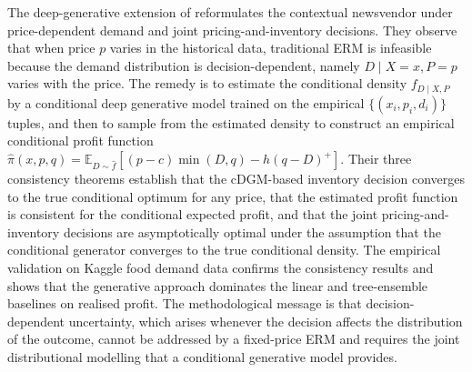 The deep-generative extension of \citet{HanZhengMisra2024} reformulates the
contextual newsvendor under price-dependent demand and joint pricing-and-inventory
decisions. They observe that when price $p$ varies in the historical data,
traditional ERM is infeasible because the demand distribution is
decision-dependent, namely $D \mid X = x, P = p$ varies with the price.
The remedy is to estimate the conditional density $f_{D \mid X, P}$ by a
conditional deep generative model trained on the empirical
$\{(x_i, p_i, d_i)\}$ tuples, and then to sample from the estimated density
to construct an empirical conditional profit function
$\hat\pi(x, p, q) = \mathbb E_{D \sim \hat f}[(p - c) \min(D, q) - h (q - D)^+]$.
Their three consistency theorems establish that the cDGM-based inventory
decision converges to the true conditional optimum for any price, that the
estimated profit function is consistent for the conditional expected profit,
and that the joint pricing-and-inventory decisions are asymptotically
optimal under the assumption that the conditional generator converges to
the true conditional density. The empirical validation on Kaggle food
demand data confirms the consistency results and shows that the
generative approach dominates the linear and tree-ensemble baselines on
realised profit. The methodological message is that decision-dependent
uncertainty, which arises whenever the decision affects the distribution of
the outcome, cannot be addressed by a fixed-price ERM and requires the
joint distributional modelling that a conditional generative model provides.

